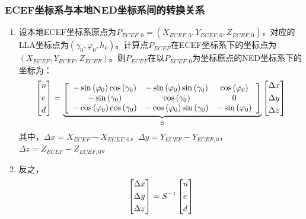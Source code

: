\subsubsection{ECEF坐标系与本地NED坐标系间的转换关系}
\begin{enumerate}
  \item 设本地ECEF坐标系原点为$P_{ECEF,0} = (X_{ECEF,0}, Y_{ECEF,0}, Z_{ECEF,0})$，对应的LLA坐标点为$(\gamma_0, \varphi_0, h_0)$。计算点$P_{ECEF}$在ECEF坐标系下的坐标点为$(X_{ECEF}, Y_{ECEF}, Z_{ECEF})$。则$P_{ECEF}$在以$P_{ECEF,0}$为坐标原点的NED坐标系下的坐标为：
  \begin{equation}
    \left[ \begin{gathered}
      n \hfill \\
      e \hfill \\
      d \hfill \\ 
    \end{gathered}  \right] = \underbrace {\left[ {\begin{array}{*{20}{c}}
      { - \sin \left( {{\varphi _0}} \right)\cos \left( {{\gamma _0}} \right)}&{ - \sin \left( {{\varphi _0}} \right)\sin \left( {{\gamma _0}} \right)}&{\cos \left( {{\varphi _0}} \right)} \\ 
      { - \sin \left( {{\gamma _0}} \right)}&{\cos \left( {{\gamma _0}} \right)}&0 \\ 
      {-\cos \left( {{\varphi _0}} \right)\cos \left( {{\gamma _0}} \right)}&{-\cos \left( {{\varphi _0}} \right)\sin \left( {{\gamma _0}} \right)}&{-\sin \left( {{\varphi _0}} \right)} 
    \end{array}} \right]}_S\left[ \begin{gathered}
      \Delta x \hfill \\
      \Delta y \hfill \\
      \Delta z \hfill \\ 
    \end{gathered}  \right]
  \end{equation}
  其中，$\Delta x = X_{ECEF} - X_{ECEF,0}$，$\Delta y = Y_{ECEF} - Y_{ECEF,0}$，$\Delta z = Z_{ECEF} - Z_{ECEF,0}$。
  \item 反之，
  \begin{equation}
    \left[ \begin{gathered}
      \Delta x \hfill \\
      \Delta y \hfill \\
      \Delta z \hfill \\ 
    \end{gathered}  \right] = {S^{ - 1}}\left[ \begin{gathered}
      n \hfill \\
      e \hfill \\
      d \hfill \\ 
    \end{gathered}  \right]
  \end{equation}
\end{enumerate}

